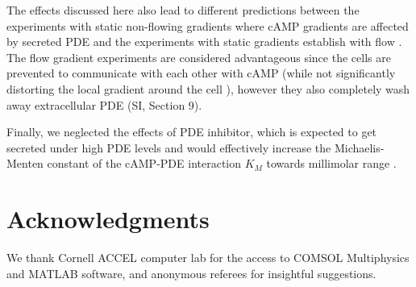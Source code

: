 \documentclass[%
 reprint,
 amsmath,amssymb,
 aps,prl,
 showpacs,
 linenumbers
]{revtex4-1}
\begin{document}

The effects discussed here also lead to different predictions between the experiments with static non-flowing gradients where cAMP gradients are affected by secreted PDE \cite{me,varnumsollStatic,fisherStatic}
and the experiments with static gradients establish with flow \cite{song,fuller-1,eberhard1}. The flow gradient experiments are considered advantageous since the cells are prevented to communicate with each other with cAMP (while not significantly distorting the local gradient around the cell \cite{ebFlow}), however they also completely wash away extracellular PDE (SI, Section 9).

Finally, we neglected the effects of PDE inhibitor, which is expected to get secreted under high PDE levels \cite{PdePdiKd} and would effectively increase the Michaelis-Menten constant of the cAMP-PDE interaction $K_M$ towards millimolar range \cite{KmcAMPPDEandPDI}.


\section*{Acknowledgments}

We thank Cornell ACCEL computer lab for the access to COMSOL Multiphysics
and MATLAB software, and anonymous referees for insightful suggestions.

\end{document}
